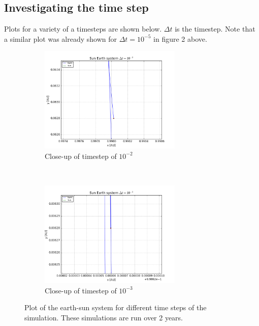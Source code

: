 \documentclass[a4paper, 10pt]{article}
\begin{document}
\subsection{Investigating the time step}
Plots for a variety of a timesteps are shown below. $\Delta t$ is the timestep. Note that a similar plot was already shown for $\Delta t = 10^{-5}$ in figure 2 above. 
\begin{figure}[!ht]
    \centering
    \begin{subfigure}[H!]{0.5\textwidth}
        \centering
        \includegraphics[height=2.0in]{orbitESe2y2png.png}
        \caption{Close-up of timestep of $10^{-2}$}
    \end{subfigure}%
    ~ 
    \begin{subfigure}[H!]{0.5\textwidth}
        \centering
        \includegraphics[height=2.0in]{orbitESe3y2png.png}
        \caption{Close-up of timestep of $10^{-3}$}
    \end{subfigure}
    \caption{Plot of the earth-sun system for different time steps of the simulation. These simulations are run over 2 years.}\label{fig:timestep}
\end{figure}
\end{document}
